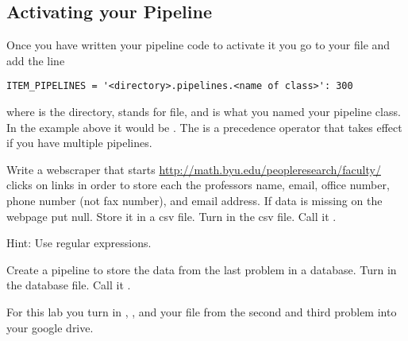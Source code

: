 \subsection*{Activating your Pipeline}
Once you have written your pipeline code to activate it you go to your  file and add the line
\begin{lstlisting}
ITEM_PIPELINES = '<directory>.pipelines.<name of class>': 300
\end{lstlisting}
where  is the directory,  stands for  file, and  is what you named your pipeline class.
In the example above it would be .
The  is a precedence operator that takes effect if you have multiple pipelines.

\begin{problem}
Write a webscraper that starts \url{http://math.byu.edu/peopleresearch/faculty/} clicks on links  in order to store each the professors name, email, office number, phone number (not fax number), and email address.
If data is missing on the webpage put null. Store it in a csv file.
Turn in the csv file. Call it .

Hint: Use regular expressions.
\end{problem}

\begin{problem}
Create a pipeline to store the data from the last problem in a database. Turn in the database file. Call it .
\end{problem}

For this lab you turn in , ,  and your  file from the second and third problem into your google drive.
